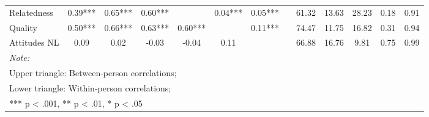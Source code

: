 \begin{table}
\begin{minipage}[t][\textheight][t]{\textwidth}
{\begin{tabular}[t]{lcccccccccccc}
\hspace{1em}Relatedness & 0.39*** & 0.65*** & 0.60*** &  & 0.04*** & 0.05*** &  & 61.32 & 13.63 & 28.23 & 0.18 & 0.91\\
\hspace{1em}Quality & 0.50*** & 0.66*** & 0.63*** & 0.60*** &  & 0.11*** &  & 74.47 & 11.75 & 16.82 & 0.31 & 0.94\\
\hspace{1em}Attitudes NL & 0.09 & 0.02 & -0.03 & -0.04 & 0.11 &  &  & 66.88 & 16.76 & 9.81 & 0.75 & 0.99\\
\bottomrule
\multicolumn{13}{l}{\rule{0pt}{1em}\textit{Note: }}\\
\multicolumn{13}{l}{\rule{0pt}{1em}Upper triangle: Between-person correlations;}\\
\multicolumn{13}{l}{\rule{0pt}{1em}Lower triangle: Within-person correlations;}\\
\multicolumn{13}{l}{\rule{0pt}{1em}*** p < .001, ** p < .01,  * p < .05}\\
\end{tabular}}
\end{minipage}
\end{table}
